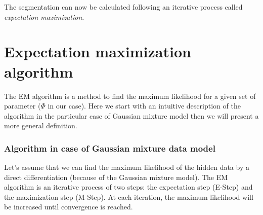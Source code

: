 \par
The segmentation can now be calculated following an iterative process called \textit{expectation maximization}.
%
\section{Expectation maximization algorithm}
The EM algorithm is a method to find the maximum likelihood for a given set of parameter ($\Phi$ in our case). Here we start with an 
intuitive description of the algorithm in the particular case of Gaussian mixture model then we will present a more general definition.
%
\subsubsection{Algorithm in case of Gaussian mixture data model}
Let's assume that we can find the maximum likelihood of the hidden data by a direct differentiation (because of the Gaussian mixture model). The EM algorithm is an iterative process of two steps: the expectation step (E-Step) and the maximization step (M-Step). At each iteration, the maximum likelihood will be increased until convergence is reached.\\

